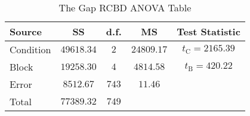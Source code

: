 \begin{table}[!htbp]
      \centering
      \caption{The Gap RCBD ANOVA Table}\label{GAPANOVA}
      \begin{NiceTabular}{|l|c|c|c|c|}
            \toprule
            Source    & SS           & d.f.    & MS           & Test Statistic             \\
            \midrule
            Condition & $ 49618.34 $ & $ 2 $   & $ 24809.17 $ & $ t_\text{C}=2165.39 $ \\
            Block     & $ 19258.30 $ & $ 4 $   & $ 4814.58 $  & $ t_\text{B}=420.22 $  \\
            Error     & $ 8512.67 $  & $ 743 $ & $ 11.46 $    &                        \\
            \midrule
            Total     & $ 77389.32 $ & $ 749 $\\
            \bottomrule
      \end{NiceTabular}
\end{table}
